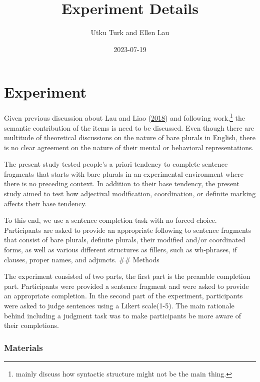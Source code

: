 \documentclass[
  10pt,
  letterpaper,
  DIV=11,
  numbers=noendperiod]{scrartcl}
\title{Experiment Details}
\author{Utku Turk and Ellen Lau}
\date{2023-07-19}
\renewcommand\maketitle{
  \fancyhead[C]{
    \mythetitle
    \ifx \theauthor\empty  \else \ – \theauthor \fi
    \ifx \thedate\empty  \else \ – \thedate \ \fi
  }
}
\begin{document}
\maketitle
\ifdefined\Shaded\renewenvironment{Shaded}{\begin{tcolorbox}[boxrule=0pt, interior hidden, sharp corners, borderline west={3pt}{0pt}{shadecolor}, frame hidden, enhanced, breakable]}{\end{tcolorbox}}\fi

\hypertarget{experiment}{%
\section{Experiment}\label{experiment}}

Given previous discussion about Lau and Liao
(\protect\hyperlink{ref-LauLiao2018}{2018}) and following
work,\footnote{mainly discuss how syntactic structure might not be the main thing.}
the semantic contribution of the items is need to be discussed. Even
though there are multitude of theoretical discussions on the nature of
bare plurals in English, there is no clear agreement on the nature of
their mental or behavioral representations.

The present study tested people's a priori tendency to complete sentence
fragments that starts with bare plurals in an experimental environment
where there is no preceding context. In addition to their base tendency,
the present study aimed to test how adjectival modification,
coordination, or definite marking affects their base tendency.

To this end, we use a sentence completion task with no forced choice.
Participants are asked to provide an appropriate following to sentence
fragments that consist of bare plurals, definite plurals, their modified
and/or coordinated forms, as well as various different structures as
fillers, such as wh-phrases, if clauses, proper names, and adjuncts.
\#\# Methods

The experiment consisted of two parts, the first part is the preamble
completion part. Participants were provided a sentence fragment and were
asked to provide an appropriate completion. In the second part of the
experiment, participants were asked to judge sentences using a Likert
scale(1-5). The main rationale behind including a judgment task was to
make participants be more aware of their completions.

\hypertarget{materials}{%
\subsubsection{Materials}\label{materials}}
\end{document}
